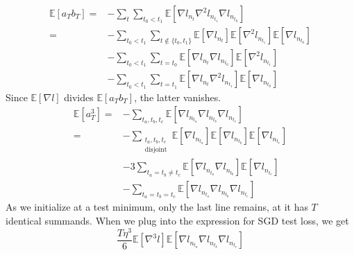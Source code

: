 \documentclass{article}
\newcommand{\expct}[1]{\mathbb{E}\left[#1\right]}
\begin{document}
            \begin{align*}
                \expct{a_T b_T}
                    =&- \sum_{t} \sum_{t_0 < t_1}
                        \expct{\nabla l_{n_t} \nabla^2 l_{n_{t_1}} \nabla l_{n_{t_0}}}
                    \\
                    =&- \sum_{t_0 < t_1}  
                        \sum_{t \notin \{t_0, t_1\}} 
                            \expct{\nabla l_{n_t}} \expct{\nabla^2 l_{n_{t_1}}} \expct{\nabla l_{n_{t_0}}}
                    \\&- \sum_{t_0 < t_1}  
                        \sum_{t = t_0}
                            \expct{\nabla l_{n_t} \nabla l_{n_{t_0}}} \expct{\nabla^2 l_{n_{t_1}}}
                    \\&- \sum_{t_0 < t_1}  
                        \sum_{t = t_1}
                            \expct{\nabla l_{n_t} \nabla^2 l_{n_{t_1}}} \expct{\nabla l_{n_{t_0}}}
            \end{align*}
            Since $\expct{\nabla l}$ divides $\expct{a_T b_T}$, the latter
            vanishes.
            \begin{align*}
                \expct{a_T^3}
                    =&- \sum_{t_a, t_b, t_c}
                            \expct{\nabla l_{n_{t_a}} \nabla l_{n_{t_b}} \nabla l_{n_{t_c}}}
                    \\
                    =&- \sum_{\substack{t_a, t_b, t_c\\ \text{disjoint}}}  
                            \expct{\nabla l_{n_{t_a}}} \expct{\nabla l_{n_{t_b}}} \expct{\nabla l_{n_{t_c}}}
                    \\&-3 \sum_{t_a=t_b\neq t_c}  
                            \expct{\nabla l_{n_{t_a}} \nabla l_{n_{t_b}}} \expct{\nabla l_{n_{t_c}}}
                    \\&-\sum_{t_a=t_b=t_c}  
                            \expct{\nabla l_{n_{t_a}} \nabla l_{n_{t_b}} \nabla l_{n_{t_c}}}
            \end{align*}
            As we initialize at a test minimum, only the last line remains, at
            it has $T$ identical summands.
            When we plug into the expression for SGD test loss, we get
            $$
                \frac{T \eta^3 }{6}
                \expct{\nabla^3 l}
                \expct{\nabla l_{n_{t_a}} \nabla l_{n_{t_b}} \nabla l_{n_{t_c}}}
            $$

\end{document}
